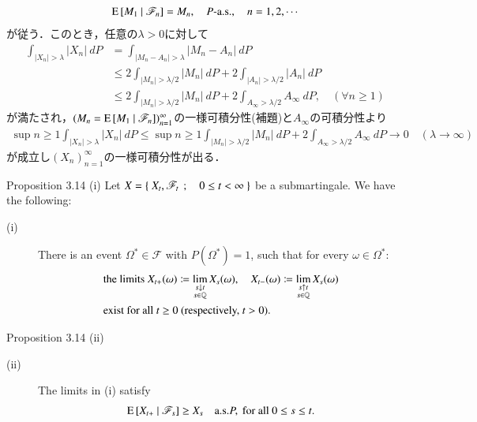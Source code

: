 \begin{prf}
\begin{align}
			\operatorname{E} \left[ M_1 \ \middle|\ \mathscr{F}_n \right] = M_n,
			\quad \mbox{$P$-a.s.},
			\quad n=1,2,\cdots
		\end{align}
		が従う．このとき，任意の$\lambda > 0$に対して
		\begin{align}
			\int_{|X_n| > \lambda} |X_n|\ dP
			&= \int_{|M_n - A_n| > \lambda} |M_n - A_n|\ dP \\
			&\leq 2 \int_{|M_n| > \lambda/2} |M_n|\ dP + 2 \int_{|A_n| > \lambda/2} |A_n|\ dP \\
			&\leq 2 \int_{|M_n| > \lambda/2} |M_n|\ dP + 2 \int_{A_\infty > \lambda/2} A_\infty\ dP,
			\quad (\forall n \geq 1)
		\end{align}
		が満たされ，$(M_n = \operatorname{E} \left[ M_1 \ \middle|\ \mathscr{F}_n \right])_{n=1}^\infty$の一様可積分性(補題)と$A_\infty$の可積分性より
		\begin{align}
			\sup{n \geq 1}{\int_{|X_n| > \lambda} |X_n|\ dP}
			\leq \sup{n \geq 1}{\int_{|M_n| > \lambda/2} |M_n|\ dP} + 2 \int_{A_\infty > \lambda/2} A_\infty\ dP
			\longrightarrow 0
			\quad (\lambda \longrightarrow \infty)
		\end{align}
		が成立し$(X_n)_{n=1}^\infty$の一様可積分性が出る．
		\QED
	\end{prf}
	
	\begin{itembox}[l]{Proposition 3.14 (i)}
		Let $X = \left\{\ X_t,\mathscr{F}_t\ \, ; \quad 0 \leq t < \infty\ \right\}$ be a submartingale. We have the following:
		\begin{description}
			\item[(i)] There is an event $\Omega^* \in \mathscr{F}$ with $P(\Omega^*) = 1$, such that for every $\omega \in \Omega^*$:
			\begin{align}
				&\mbox{the limits } X_{t+}(\omega) \coloneqq \lim_{\substack{s \downarrow t \\ s \in \mathbb{Q}}} X_s(\omega),
				\quad X_{t-}(\omega) \coloneqq \lim_{\substack{s \uparrow t \\ s \in \mathbb{Q}}} X_s(\omega) \\
				&\mbox{exist for all $t \geq 0$ (respectively, $t > 0$).}
			\end{align}
		\end{description}
	\end{itembox}
	
	\begin{itembox}[l]{Proposition 3.14 (ii)}
		\begin{description}
			\item[(ii)] The limits in (i) satisfy
			\begin{align}
				\operatorname{E} \left[ X_{t+} \ \middle|\ \mathscr{F}_s \right] \geq X_s \quad \mbox{a.s.} P,\ \mbox{for all } 0 \leq s \leq t.
			\end{align}
		\end{description}
	\end{itembox}
	
